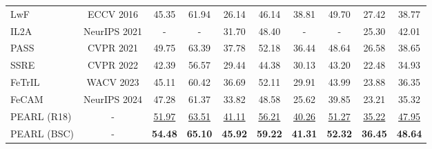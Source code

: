 \documentclass[10pt]{article} %
\begin{document}
\begin{table}[t]
{\begin{tabular}{l|c|cc|cc|cc|cc}
        \midrule
        LwF \citep{li2017learning}  & ECCV 2016 & 45.35 & 61.94 & 26.14 & 46.14 & 38.81 & 49.70 & 27.42 & 38.77 \\
        IL2A \citep{zhu2021class} & NeurIPS 2021 & - & - & 31.70 & 48.40 & - & - & 25.30 & 42.01 \\
        PASS \citep{zhu2021prototype} & CVPR 2021 & 49.75 & 63.39 & 37.78 & 52.18 & 36.44 & 48.64 & 26.58 & 38.65 \\
        SSRE \citep{zhu2022self} & CVPR 2022 & 42.39 & 56.57 & 29.44 & 44.38 & 30.13 & 43.20 & 22.48 & 34.93 \\
        FeTrIL \citep{petit2023fetril}  & WACV 2023 & 45.11 & 60.42 & 36.69 & 52.11 & 29.91 & 43.99 & 23.88 & 36.35 \\
        FeCAM \citep{goswami2024fecam} & NeurIPS 2024 & 47.28 & 61.37 & 33.82 & 48.58 & 25.62 & 39.85 & 23.21 & 35.32 \\
        \midrule
        PEARL (R18) & - & \underline{51.97} & \underline{63.51} & \underline{41.11} & \underline{56.21} & \underline{40.26}  & \underline{51.27} & \underline{35.22} & \underline{47.95} \\
        
        PEARL (BSC) & - & \textbf{54.48} & \textbf{65.10} & \textbf{45.92} &  \textbf{59.22} &  \textbf{41.31} & 	\textbf{52.32} & \textbf{36.45} & \textbf{48.64} \\
        
        \bottomrule
        \end{tabular}
    }
\end{table}
\end{document}
